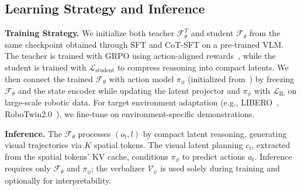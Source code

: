 

\subsection{Learning Strategy and Inference}\label{ssec:inference}

\noindent\textbf{Training Strategy.}
We initialize both teacher $\mathcal{F}_\theta^T$ and student $\mathcal{F}_\theta$ from the same checkpoint obtained through SFT and CoT-SFT on a pre-trained VLM. The teacher is trained with GRPO using action-aligned rewards~\cite{huang2025thinkact}, while the student is trained with $\mathcal{L}_\text{student}$ to compress reasoning into compact latents. We then connect the trained $\mathcal{F}_\theta$ with action model $\pi_\phi$ (initialized from~\cite{liu2024rdt}) by freezing $\mathcal{F}_\theta$ and the state encoder while updating the latent projector and $\pi_\phi$ with $\mathcal{L}_{\text{IL}}$ on large-scale robotic data. For target environment adaptation (e.g., LIBERO~\cite{liu2023libero}, RoboTwin2.0~\cite{chen2025robotwin2}), we fine-tune on environment-specific demonstrations.


\noindent\textbf{Inference.} 
The $\mathcal{F}_\theta$ processes $(o_t, l)$ by compact latent reasoning, generating visual trajectories via $K$ spatial tokens. The visual latent planning $c_t$, extracted from the spatial tokens' KV cache, conditions $\pi_\phi$ to predict actions $a_t$. Inference requires only $\mathcal{F}_\theta$ and $\pi_\phi$; the verbalizer $\mathcal{V}_\psi$ is used solely during training and optionally for interpretability.
